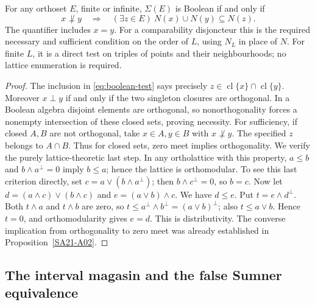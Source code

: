 \begin{theorem}\label{SA21-A04}
For any orthoset $E$, finite or infinite, $\Sigma(E)$ is Boolean if and
only if
\begin{equation}\label{eq:boolean-test}
 x\not\perp y\quad\Longrightarrow\quad
 (\exists z\in E)\ N(x)\cup N(y)\subseteq N(z).
\end{equation}
The quantifier includes $x=y$. For a comparability disjoncteur this is
the required necessary and sufficient condition on the order of $L$,
using $N_L$ in place of $N$. For finite $L$, it is a direct test on
triples of points and their neighbourhoods; no lattice enumeration is
required.
\end{theorem}
\begin{proof}
The inclusion in \eqref{eq:boolean-test} says precisely
$z\in\operatorname{cl}\{x\}\cap\operatorname{cl}\{y\}$.
Moreover $x\perp y$ if and only if the two singleton closures are
orthogonal. In a Boolean algebra disjoint elements are orthogonal,
so nonorthogonality forces a nonempty intersection of these closed
sets, proving necessity.
For sufficiency, if closed $A,B$ are not orthogonal, take
$x\in A,y\in B$ with $x\not\perp y$. The specified $z$ belongs to
$A\cap B$. Thus for closed sets, zero meet implies orthogonality.
We verify the purely lattice-theoretic last step. In any ortholattice
with this property, $a\leq b$ and $b\wedge a^\perp=0$ imply
$b\leq a$; hence the lattice is orthomodular. To see this last
criterion directly, set $c=a\vee(b\wedge a^\perp)$; then
$b\wedge c^\perp=0$, so $b=c$.
Now let $d=(a\wedge c)\vee(b\wedge c)$ and
$e=(a\vee b)\wedge c$. We have $d\leq e$. Put
$t=e\wedge d^\perp$. Both $t\wedge a$ and $t\wedge b$ are zero,
so $t\leq a^\perp\wedge b^\perp=(a\vee b)^\perp$; also
$t\leq a\vee b$. Hence $t=0$, and orthomodularity gives $e=d$.
This is distributivity. The converse implication from orthogonality
to zero meet was already established in Proposition~\ref{SA21-A02}.
\end{proof}

\subsection{The interval magasin and the false Sumner equivalence}

